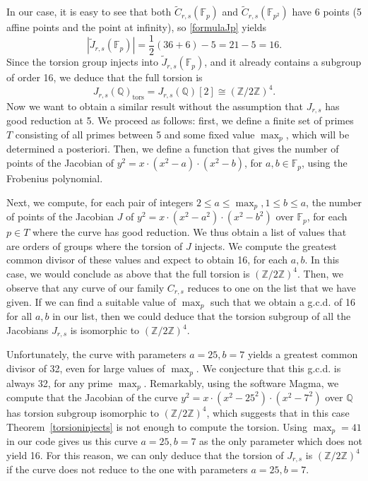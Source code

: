 \documentclass[a4paper, 12pt]{amsart}
\theoremstyle{definition}
\theoremstyle{plain}
\theoremstyle{plain}
\theoremstyle{plain}
\theoremstyle{plain}
\theoremstyle{remark}
\theoremstyle{remark}
\theoremstyle{plain}
\newcommand{\thmref}[1]{Theorem~\ref{#1}}
\newcommand{\Q}{\mathbb{Q}}
\newcommand{\Zmod}[1]{\mathbb{Z}/#1\mathbb{Z}}
\begin{document}
	In our case, it is easy to see that both $\tilde{C}_{r,s}(\mathbb{F}_p)$ and $\tilde{C}_{r,s}(\mathbb{F}_{p^2})$ have 6 points (5 affine points and the point at infinity), so \eqref{formulaJp} yields
	\begin{equation*}
		|\tilde{J}_{r,s}(\mathbb{F}_p)|=\frac{1}{2}(36+6)-5=21-5=16.
	\end{equation*}
	Since the torsion group injects into $\tilde{J}_{r,s}(\mathbb{F}_p)$, and it already contains a subgroup of order 16, we deduce that the full torsion is
	\begin{equation*}
		J_{r,s}(\Q)_\text{tors}=J_{r,s}(\Q)[2]\cong\left(\Zmod{2}\right)^4.
	\end{equation*}
	Now we want to obtain a similar result without the assumption that $J_{r,s}$ has good reduction at 5. We proceed as follows: first, we define a finite set of primes $T$ consisting of all primes between 5 and some fixed value $\max_p$, which will be determined a posteriori. Then, we define a function that gives the number of points of the Jacobian of $y^2=x\cdot(x^2-a)\cdot(x^2-b)$, for $a,b\in\mathbb{F}_p$, using the Frobenius polynomial.
	
	Next, we compute, for each pair of integers $2\le a\le \max_p,1\le b\le a$, the number of points of the Jacobian $J$ of $y^2=x\cdot(x^2-a^2)\cdot(x^2-b^2)$ over $\mathbb{F}_p$, for each $p\in T$ where the curve has good reduction. We thus obtain a list of values that are orders of groups where the torsion of $J$ injects. We compute the greatest common divisor of these values and expect to obtain 16, for each $a,b$. In this case, we would conclude as above that the full torsion is $\left(\Zmod{2}\right)^4$. Then, we observe that any curve of our family $C_{r,s}$ reduces to one on the list that we have given. If we can find a suitable value of $\max_p$ such that we obtain a g.c.d. of 16 for all $a,b$ in our list, then we could deduce that the torsion subgroup of all the Jacobians $J_{r,s}$ is isomorphic to $\left(\Zmod{2}\right)^4$.	
	
	Unfortunately, the curve with parameters $a=25,b=7$ yields a greatest common divisor of 32, even for large values of $\max_p$. We conjecture that this g.c.d. is always 32, for any prime $\max_p$. Remarkably, using the software Magma, we compute that the Jacobian of the curve $y^2=x\cdot (x^2-25^2)\cdot(x^2-7^2)$ over $\Q$ has torsion subgroup isomorphic to $\left(\Zmod{2}\right)^4$, which suggests that in this case \thmref{torsioninjects} is not enough to compute the torsion. Using $\max_p=41$ in our code gives us this curve $a=25,b=7$ as the only parameter which does not yield 16. For this reason, we can only deduce that the torsion of $J_{r,s}$ is $\left(\Zmod{2}\right)^4$ if the curve does not reduce to the one with parameters $a=25,b=7$.
	
\end{document}
